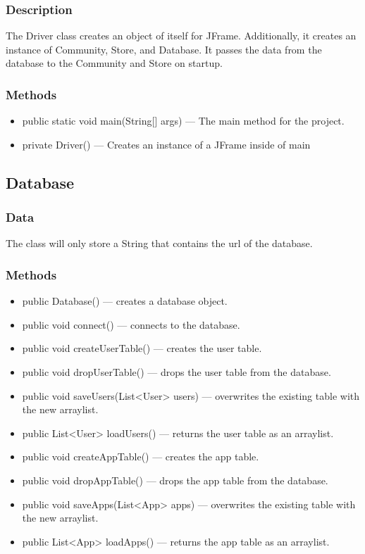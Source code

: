 \documentclass{article}
\begin{document}
\subsubsection{Description}
The Driver class creates an object of itself for JFrame. Additionally, it creates an instance of Community, Store, and Database. It passes the data from the database to the Community and Store on startup.
\subsubsection{Methods}
\begin{itemize}
    \item{public static void main(String[] args)}
        --- The main method for the project.
    \item{private Driver()}
        --- Creates an instance of a JFrame inside of main
\end{itemize}
\subsection{Database}
\subsubsection{Data}
The class will only store a String that contains the url of the database.
\subsubsection{Methods}
\begin{itemize}
    \item{public Database()}
        --- creates a database object.
    \item{public void connect()}
        --- connects to the database.
    \item{public void createUserTable()}
        --- creates the user table.
    \item{public void dropUserTable()}
        --- drops the user table from the database.
    \item{public void saveUsers(List<User> users)}
        --- overwrites the existing table with the new arraylist.
    \item{public List<User> loadUsers()}
        --- returns the user table as an arraylist.
    \item{public void createAppTable()}
        --- creates the app table.
    \item{public void dropAppTable()}
        --- drops the app table from the database.
    \item{public void saveApps(List<App> apps)}
        --- overwrites the existing table with the new arraylist.
    \item{public List<App> loadApps()}
        --- returns the app table as an arraylist.
\end{itemize}
\end{document}
